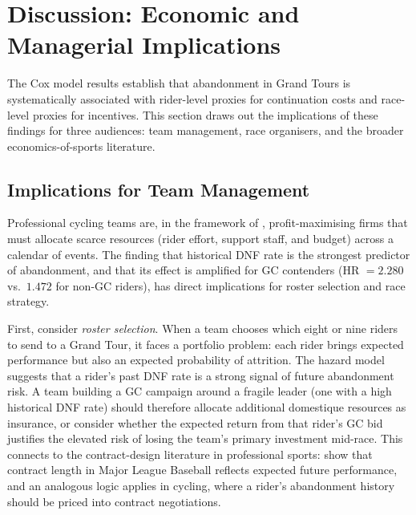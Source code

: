 \section{Discussion: Economic and Managerial Implications}
\label{sec:discussion}

The Cox model results establish that abandonment in Grand Tours is systematically associated with rider-level proxies for continuation costs and race-level proxies for incentives. This section draws out the implications of these findings for three audiences: team management, race organisers, and the broader economics-of-sports literature.

\subsection{Implications for Team Management}

Professional cycling teams are, in the framework of \textcite{blair2012sports}, profit-maximising firms that must allocate scarce resources (rider effort, support staff, and budget) across a calendar of events. The finding that historical DNF rate is the strongest predictor of abandonment, and that its effect is amplified for GC contenders (HR $= 2.280$ vs.\ $1.472$ for non-GC riders), has direct implications for roster selection and race strategy.

First, consider \emph{roster selection}. When a team chooses which eight or nine riders to send to a Grand Tour, it faces a portfolio problem: each rider brings expected performance but also an expected probability of attrition. The hazard model suggests that a rider's past DNF rate is a strong signal of future abandonment risk. A team building a GC campaign around a fragile leader (one with a high historical DNF rate) should therefore allocate additional domestique resources as insurance, or consider whether the expected return from that rider's GC bid justifies the elevated risk of losing the team's primary investment mid-race. This connects to the contract-design literature in professional sports: \textcite{krautmann2002contracts} show that contract length in Major League Baseball reflects expected future performance, and an analogous logic applies in cycling, where a rider's abandonment history should be priced into contract negotiations.

